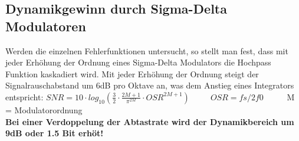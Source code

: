 \subsection{Dynamikgewinn durch Sigma-Delta Modulatoren}
Werden die einzelnen Fehlerfunktionen untersucht, so stellt man fest, dass mit jeder Erhöhung der Ordnung eines Sigma-Delta Modulators die Hochpass Funktion kaskadiert wird. Mit jeder Erhöhung der Ordnung steigt der Signalrauschabstand um 6dB pro Oktave an, was dem Anstieg eines Integrators entspricht: $SNR = 10 \cdot log_{10} (\frac{3}{2} \cdot \frac{2M+1}{\pi^{2M}}\cdot OSR^{2M+1})$\ \ \ \ \
$OSR=fs/2f0$ \ \ \ \ \ M = Modulatorordnung\\ 
\textbf{Bei einer Verdoppelung der Abtastrate wird der Dynamikbereich um 9dB oder 1.5 Bit erhöt!}

